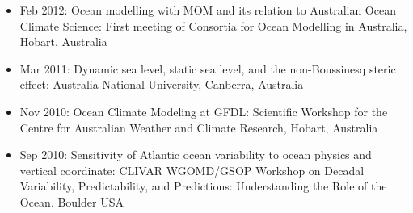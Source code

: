 \begin{itemize}[leftmargin=*]
\item Feb 2012: {\sc Ocean modelling with MOM and its relation to
    Australian Ocean Climate Science}: First meeting of Consortia for
  Ocean Modelling in Australia, Hobart, Australia

\item Mar 2011: {\sc Dynamic sea level, static sea level, and the
    non-Boussinesq steric effect}: Australia National University,
  Canberra, Australia

\item Nov 2010:  {\sc Ocean Climate Modeling at GFDL}: Scientific
  Workshop for the Centre for Australian Weather and Climate Research,
  Hobart, Australia

\item Sep 2010:  {\sc Sensitivity of Atlantic ocean variability to
    ocean physics and vertical coordinate}: CLIVAR WGOMD/GSOP Workshop
  on Decadal Variability, Predictability, and Predictions:
  Understanding the Role of the Ocean. Boulder USA 




\end{itemize}
